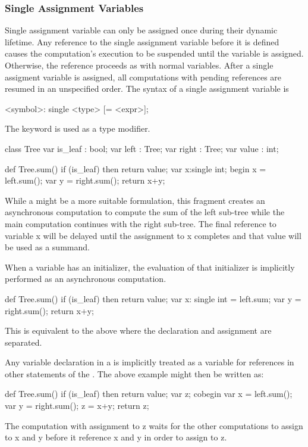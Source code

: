 \subsubsection{Single Assignment Variables}
\label{Single_Assignment_Variables}

Single assignment variable can only be assigned once during their
dynamic lifetime.  Any reference to the single assignment variable
before it is defined causes the computation's execution to be
suspended until the variable is assigned. Otherwise, the reference
proceeds as with normal variables.  After a single assigment variable is
assigned, all computations with pending references are resumed in an
unspecified order. The syntax of a single assignment variable is
\begin{chapel}
[var] <symbol>: single <type> [= <expr>];
\end{chapel}
The keyword  is used as a type modifier. 

\begin{example}
\begin{chapel}
class Tree {
  var is_leaf : bool;
  var left    : Tree;
  var right   : Tree;
  var value   : int;
}

def Tree.sum() {
  if (is_leaf) then return value;
  var x:single int;
  begin x = left.sum();
  var y = right.sum();
  return x+y;
}
\end{chapel}
While a  might be a more suitable formulation, this
fragment creates an asynchronous computation to compute the sum of the
left sub-tree while the main computation continues with the right
sub-tree. The final reference to variable x will be delayed until the
assignment to x completes and that value will be used as a summand.
\end{example}

When a  variable has an initializer, the evaluation of
that initializer is implicitly performed as an asynchronous
computation. 
\begin{example}
\begin{chapel}
def Tree.sum() {
  if (is_leaf) then return value;
  var x: single int = left.sum;
  var y = right.sum();
  return x+y;
}
\end{chapel}
This is equivalent to the above where the declaration and assignment are
separated.
\end{example}

Any variable declaration in a  is implicitly treated as
a  variable for references in other statements of the
.  The above example might then be written as:
\begin{example}
\begin{chapel}
def Tree.sum() {
  if (is_leaf) then return value;
  var z;
  cobegin {
    var x = left.sum();
    var y = right.sum();
    z = x+y;
  }
  return z;
}
\end{chapel}
The computation with assignment to z waits for the other computations 
to assign to x and y before it reference x and y in order to assign to z.
\end{example}

